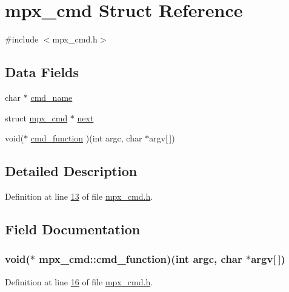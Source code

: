 \hypertarget{structmpx__cmd}{
\section{mpx\_\-cmd Struct Reference}
\label{structmpx__cmd}
}


{\ttfamily \#include $<$mpx\_\-cmd.h$>$}

\subsection*{Data Fields}
\begin{DoxyCompactItemize}
\item 
char $\ast$ \hyperlink{structmpx__cmd_aeae73296151ffcec319820f4d8399e51}{cmd\_\-name}
\item 
struct \hyperlink{structmpx__cmd}{mpx\_\-cmd} $\ast$ \hyperlink{structmpx__cmd_a863c991d0d31b283791615b5f5fe03bb}{next}
\item 
void($\ast$ \hyperlink{structmpx__cmd_ad35d459cc43aac3f75fb308e07572253}{cmd\_\-function} )(int argc, char $\ast$argv\mbox{[}$\,$\mbox{]})
\end{DoxyCompactItemize}


\subsection{Detailed Description}


Definition at line \hyperlink{mpx__cmd_8h_source_l00013}{13} of file \hyperlink{mpx__cmd_8h_source}{mpx\_\-cmd.h}.



\subsection{Field Documentation}
\hypertarget{structmpx__cmd_ad35d459cc43aac3f75fb308e07572253}{
\subsubsection[{cmd\_\-function}]{\setlength{\rightskip}{0pt plus 5cm}void($\ast$ {\bf mpx\_\-cmd::cmd\_\-function})(int argc, char $\ast$argv\mbox{[}$\,$\mbox{]})}}
\label{structmpx__cmd_ad35d459cc43aac3f75fb308e07572253}


Definition at line \hyperlink{mpx__cmd_8h_source_l00016}{16} of file \hyperlink{mpx__cmd_8h_source}{mpx\_\-cmd.h}.

